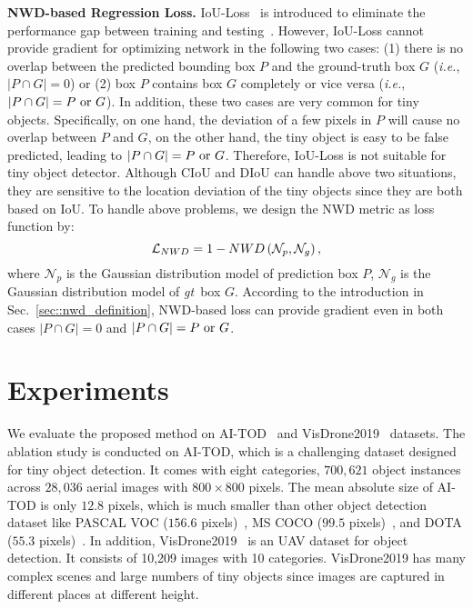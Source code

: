 \documentclass{article}
\newcommand{\equspace}{3.0pt}
\newcommand{\ie}{\textit{i.e.}}
\newcommand{\gt}{\textit{gt}~}
\begin{document}
\textbf{NWD-based Regression Loss.} IoU-Loss~\cite{Unitbox_2016_ACMM} is introduced to eliminate the performance gap between training and testing~\cite{GIoU_loss_2019_CVPR}. However, IoU-Loss cannot provide gradient for optimizing network in the following two cases: (1) there is no overlap between the predicted bounding box $P$ and the ground-truth box $G$ (\ie, $|P\cap G| = 0$) or (2) box $P$ contains box $G$ completely or vice versa (\ie, $|P\cap G| = P~{\rm or}~G$). In addition, these two cases are very common for tiny objects. Specifically, on one hand, the deviation of a few pixels in $P$ will cause no overlap between $P$ and $G$, on the other hand, the tiny object is easy to be false predicted, leading to $|P\cap G| = P~{\rm or}~G$. Therefore, IoU-Loss is not suitable for tiny object detector. Although CIoU and DIoU can handle above two situations, they are sensitive to the location deviation of the tiny objects since they are both based on IoU. To handle above problems, we design the NWD metric as loss function by:
\begin{equation}
    \setlength{\abovedisplayskip}{\equspace}
	\setlength{\belowdisplayskip}{\equspace}
   \mathcal{L}_{NWD} = 1 - NWD\left(\mathcal{N}_p, \mathcal{N}_g\right),
\end{equation}
where $\mathcal{N}_{p}$ is the Gaussian distribution model of prediction box $P$, $\mathcal{N}_{g}$ is the Gaussian distribution model of \gt box $G$. According to the introduction in Sec.~\ref{sec::nwd_definition}, NWD-based loss can provide gradient even in both cases $|P\cap G| = 0$ and $|P\cap G| = P~{\rm or}~G$.

\section{Experiments}

\label{experiment_details}
We evaluate the proposed method on AI-TOD~\cite{AI-TOD_2020_ICPR} and VisDrone2019~\cite{visdrone2019_2019_iccvw} datasets. The ablation study is conducted on AI-TOD, which is a challenging dataset designed for tiny object detection. It comes with eight categories, $700,621$ object instances across $28,036$ aerial images with $800\times 800$ pixels. The mean absolute size of AI-TOD is only $12.8$ pixels, which is much smaller than other object detection dataset like PASCAL VOC ($156.6$ pixels)~\cite{PASCAL-VOC_2015-IJCV}, MS COCO ($99.5$ pixels)~\cite{COCO_2014_ECCV}, and DOTA ($55.3$ pixels)~\cite{DOTA_2018_CVPR}. In addition, VisDrone2019~\cite{visdrone2019_2019_iccvw} is an UAV dataset for object detection. It consists of 10,209 images with 10 categories. VisDrone2019 has many complex scenes and large numbers of tiny objects since images are captured in different places at different height.
\end{document}
